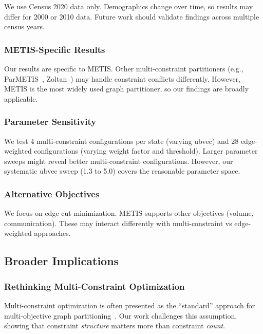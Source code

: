 We use Census 2020 data only. Demographics change over time, so results may differ for 2000 or 2010 data. Future work should validate findings across multiple census years.

\subsubsection{METIS-Specific Results}

Our results are specific to METIS. Other multi-constraint partitioners (e.g., ParMETIS~\cite{karypis2003parmetis}, Zoltan~\cite{devine2002zoltan}) may handle constraint conflicts differently. However, METIS is the most widely used graph partitioner, so our findings are broadly applicable.

\subsubsection{Parameter Sensitivity}

We test 4 multi-constraint configurations per state (varying ubvec) and 28 edge-weighted configurations (varying weight factor and threshold). Larger parameter sweeps might reveal better multi-constraint configurations. However, our systematic ubvec sweep (1.3 to 5.0) covers the reasonable parameter space.

\subsubsection{Alternative Objectives}

We focus on edge cut minimization. METIS supports other objectives (volume, communication). These may interact differently with multi-constraint vs edge-weighted approaches.

\subsection{Broader Implications}

\subsubsection{Rethinking Multi-Constraint Optimization}

Multi-constraint optimization is often presented as the ``standard'' approach for multi-objective graph partitioning~\cite{karypis1999multilevel}. Our work challenges this assumption, showing that constraint \textit{structure} matters more than constraint \textit{count}.

